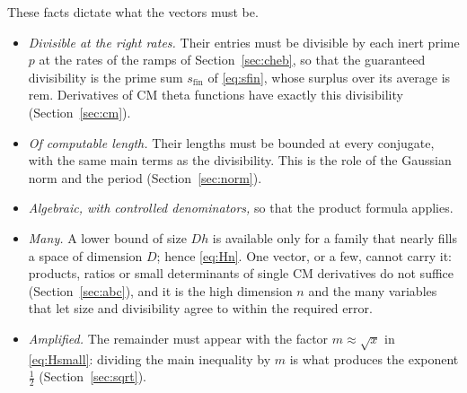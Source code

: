 \documentclass[11pt]{amsart}
\numberwithin{equation}{section}
\theoremstyle{definition}
\theoremstyle{remark}
\begin{document}
These facts dictate what the vectors must be.
\begin{itemize}[leftmargin=2em]
\item \emph{Divisible at the right rates.} Their entries must be divisible by each inert prime $p$ at the rates of the ramps of Section~\ref{sec:cheb}, so that the guaranteed divisibility is the prime sum $s_{\mathrm{fin}}$ of \eqref{eq:sfin}, whose surplus over its average is $\mathrm{rem}$. Derivatives of CM theta functions have exactly this divisibility (Section~\ref{sec:cm}).
\item \emph{Of computable length.} Their lengths must be bounded at every conjugate, with the same main terms as the divisibility. This is the role of the Gaussian norm and the period (Section~\ref{sec:norm}).
\item \emph{Algebraic, with controlled denominators,} so that the product formula applies.
\item \emph{Many.} A lower bound of size $Dh$ is available only for a family that nearly fills a space of dimension $D$; hence \eqref{eq:Hn}. One vector, or a few, cannot carry it: products, ratios or small determinants of single CM derivatives do not suffice (Section~\ref{sec:abc}), and it is the high dimension $n$ and the many variables that let size and divisibility agree to within the required error.
\item \emph{Amplified.} The remainder must appear with the factor $m\approx\sqrt x$ in \eqref{eq:Hsmall}: dividing the main inequality by $m$ is what produces the exponent $\frac12$ (Section~\ref{sec:sqrt}).
\end{itemize}
\end{document}
